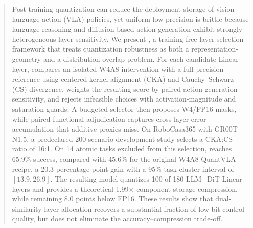 \begin{abstract}
Post-training quantization can reduce the deployment storage of vision-language-action (VLA) policies, yet uniform low precision is brittle because language reasoning and diffusion-based action generation exhibit strongly heterogeneous layer sensitivity.
We present \method, a training-free layer-selection framework that treats quantization robustness as both a representation-geometry and a distribution-overlap problem. For each candidate Linear layer, \method compares an isolated W4A8 intervention with a full-precision reference using centered kernel alignment (CKA) and Cauchy--Schwarz (CS) divergence, weights the resulting score by paired action-generation sensitivity, and rejects infeasible choices with activation-magnitude and saturation guards. A budgeted selector then proposes W4/FP16 masks, while paired functional adjudication captures cross-layer error accumulation that additive proxies miss.
On RoboCasa365 with GR00T N1.5, a predeclared 200-scenario development study selects a CKA:CS ratio of 16:1. On 14 atomic tasks excluded from this selection, \method reaches 65.9\% success, compared with 45.6\% for the original W4A8 QuantVLA recipe, a 20.3 percentage-point gain with a 95\% task-cluster interval of $[13.9,26.9]$. The resulting model quantizes 100 of 180 LLM+DiT Linear layers and provides a theoretical 1.99$\times$ component-storage compression, while remaining 8.0 points below FP16. These results show that dual-similarity layer allocation recovers a substantial fraction of low-bit control quality, but does not eliminate the accuracy--compression trade-off.
\end{abstract}
